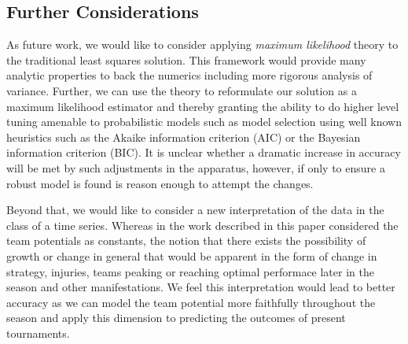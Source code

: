 \documentclass{article} %
\begin{document}
\subsection{Further Considerations}
As future work, we would like to consider applying \emph{maximum likelihood} theory to the traditional least squares solution. This framework would provide many analytic properties to back the numerics including more rigorous analysis of variance. Further, we can use the theory to reformulate our solution as a maximum likelihood estimator and thereby granting the ability to do higher level tuning amenable to probabilistic models such as model selection using well known heuristics such as the Akaike information criterion (AIC) or the Bayesian information criterion (BIC). It is unclear whether a dramatic increase in accuracy will be met by such adjustments in the apparatus, however, if only to ensure a robust model is found is reason enough to attempt the changes.

Beyond that, we would like to consider a new interpretation of the data in the class of a time series. Whereas in the work described in this paper considered the team potentials as constants, the notion that there exists the possibility of growth or change in general that would be apparent in the form of change in strategy, injuries, teams peaking or reaching optimal performace later in the season and other manifestations. We feel this interpretation would lead to better accuracy as we can model the team potential more faithfully throughout the season and apply this dimension to predicting the outcomes of present tournaments.




\end{document}
